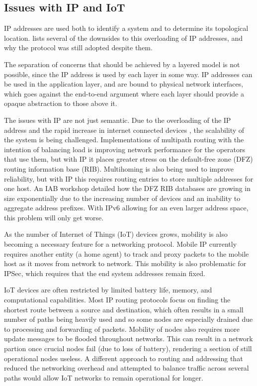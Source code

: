 \documentclass[12pt]{article}
\begin{document}
\subsection{Issues with IP and IoT}

IP addresses are used both to identify a system and to determine its topological location. \cite{briancarpenter2014} lists several of the downsides to this overloading of IP addresses, and why the protocol was still adopted despite them.

The separation of concerns that should be achieved by a layered model is not possible, since the IP address is used by each layer in some way. IP addresses can be used in the application layer, and are bound to physical network interfaces, which goes against the end-to-end argument where each layer should provide a opaque abstraction to those above it.

The issues with IP are not just semantic. Due to the overloading of the IP address and the rapid increase in internet connected devices \cite{iot_stat}, the scalability of the system is being challenged. Implementations of multipath routing with the intention of balancing load is improving network performance for the operators that use them, but with IP it places greater stress on the default-free zone (DFZ) routing information base (RIB). Multihoming is also being used to improve reliability, but with IP this requires routing entries to store multiple addresses for one host. An IAB workshop \cite{rfc4984} detailed how the DFZ RIB databases are growing in size exponentially due to the increasing number of devices and an inability to aggregate address prefixes. With IPv6 allowing for an even larger address space, this problem will only get worse. 

As the number of Internet of Things (IoT) devices grows, mobility is also becoming a necessary feature for a networking protocol. Mobile IP currently requires another entity (a home agent) to track and proxy packets to the mobile host as it moves from network to network. This mobility is also problematic for IPSec, which requires that the end system addresses remain fixed.

IoT devices are often restricted by limited battery life, memory, and computational capabilities. Most IP routing protocols focus on finding the shortest route between a source and destination, which often results in a small number of paths being heavily used and so some nodes are especially drained due to processing and forwarding of packets. Mobility of nodes also requires more update messages to be flooded throughout networks. This can result in a network partion once crucial nodes fail (due to loss of battery), rendering a section of still operational nodes useless. A different approach to routing and addressing that reduced the networking overhead and attempted to balance traffic across several paths would allow IoT networks to remain operational for longer. 
\end{document}
